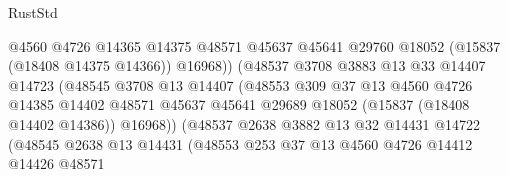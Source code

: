 \begin{lexlean}{RustStd}
\begin{coremodule}
                                      @4560
                                      @4726
                                      @14365
                                      @14375
                                      @48571
                                      @45637
                                      @45641
                                      @29760
                                      @18052
                                      (@15837 (@18408 @14375 @14366))
                                      @16968))
                                  (@48537
                                    @3708
                                    @3883
                                    @13
                                    @33
                                    @14407
                                    @14723
                                    (@48545
                                      @3708
                                      @13
                                      @14407
                                      (@48553
                                        @309
                                        @37
                                        @13
                                        @4560
                                        @4726
                                        @14385
                                        @14402
                                        @48571
                                        @45637
                                        @45641
                                        @29689
                                        @18052
                                        (@15837 (@18408 @14402 @14386))
                                        @16968))
                                    (@48537
                                      @2638
                                      @3882
                                      @13
                                      @32
                                      @14431
                                      @14722
                                      (@48545
                                        @2638
                                        @13
                                        @14431
                                        (@48553
                                          @253
                                          @37
                                          @13
                                          @4560
                                          @4726
                                          @14412
                                          @14426
                                          @48571

\end{coremodule}
\end{lexlean}
